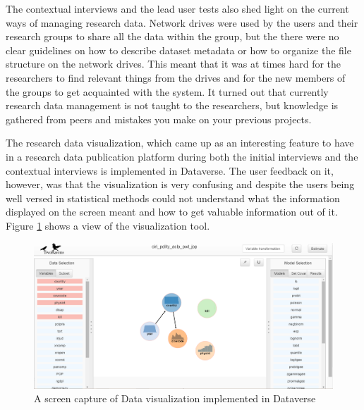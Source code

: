 The contextual interviews and the lead user tests also shed light on the
current ways of managing research data. Network drives were used by the
users and their research groups to share all the data within the group, but
the there were no clear guidelines on how to describe dataset metadata or how
to organize the file structure on the network drives. This meant that it was
at times hard for the researchers to find relevant things from the drives and
for the new members of the groups to get acquainted with the system. It turned
out that currently research data management is not taught to the researchers,
but knowledge is gathered from peers and mistakes you make on your previous
projects.

The research data visualization, which came up as an interesting feature to
have in a research data publication platform during both the initial interviews
and the contextual interviews is implemented in Dataverse. The user feedback
on it, however, was that the visualization is very confusing and despite the
users being well versed in statistical methods could not understand what the
information displayed on the screen meant and how to get valuable information
out of it. Figure \ref{fig:tworavens} shows a view of the visualization tool.

\begin{figure}
    \begin{centering}
        \includegraphics[width=\textwidth]{images/tworavens}
    \end{centering}
    \caption{A screen capture of Data visualization implemented in Dataverse}
    \label{fig:tworavens}
\end{figure}

